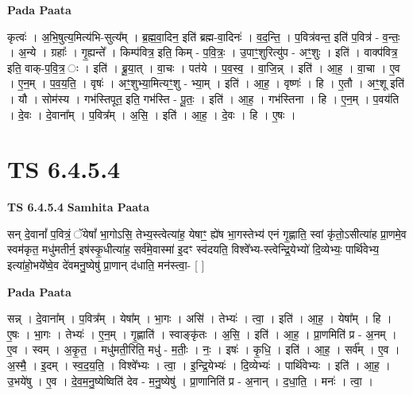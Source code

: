 \documentclass[17pt]{extarticle}
\begin{document}
\textbf{Pada Paata} \newline

कृत्वः॑ । अ॒भि॒षुत्य॒मित्य॑भि-सुत्य᳚म् । ब्र॒ह्म॒वा॒दिन॒ इति॑ ब्रह्म-वा॒दिनः॑ । व॒द॒न्ति॒ । प॒वित्र॑वन्त॒ इति॑ प॒वित्र॑ - व॒न्तः॒ । अ॒न्ये । ग्रहाः᳚ । गृ॒ह्यन्ते᳚ । किम्प॑वित्र॒ इति॒ किम् - प॒वि॒त्रः॒ । उ॒पाꣳ॒॒शुरित्यु॑प - अꣳ॒॒शुः । इति॑ । वाक्प॑वित्र॒ इति॒ वाक्-प॒वि॒त्र॒ ः । इति॑ । ब्रू॒या॒त् । वा॒चः । पत॑ये । प॒व॒स्व॒ । वा॒जि॒न्न् । इति॑ । आ॒ह॒ । वा॒चा । ए॒व । ए॒न॒म् । प॒व॒य॒ति॒ । वृषः॑ । अꣳ॒॒शुभ्या॒मित्यꣳ॒॒शु - भ्या॒म् । इति॑ । आ॒ह॒ । वृष्णः॑ । हि । ए॒तौ । अꣳ॒॒शू इति॑ । यौ । सोम॑स्य । गभ॑स्तिपूत॒ इति॒ गभ॑स्ति - पू॒तः॒ । इति॑ । आ॒ह॒ । गभ॑स्तिना । हि । ए॒न॒म् । प॒वय॑ति । दे॒वः । दे॒वाना᳚म् । प॒वित्र᳚म् । अ॒सि॒ । इति॑ । आ॒ह॒ । दे॒वः । हि । ए॒षः ।  \newline





\section{ TS 6.4.5.4 }

\textbf{TS 6.4.5.4 } \newline
\textbf{Samhita Paata} \newline

सन् दे॒वानां᳚ प॒वित्रं॒ ॅयेषां᳚ भा॒गोऽसि॒ तेभ्य॒स्त्वेत्या॑ह॒ येषाꣳ॒॒ ह्ये॑ष भा॒गस्तेभ्य॑ एनं गृ॒ह्णाति॒ स्वां कृ॑तो॒ऽसीत्या॑ह प्रा॒णमे॒व स्वम॑कृत॒ मधु॑मतीर्न॒ इष॑स्कृ॒धीत्या॑ह॒ सर्व॑मे॒वास्मा॑ इ॒दꣳ स्व॑दयति॒ विश्वे᳚भ्य-स्त्वेन्द्रि॒येभ्यो॑ दि॒व्येभ्यः॒ पार्थि॑वेभ्य॒ इत्या॑हो॒भये᳚ष्वे॒व दे॑वमनु॒ष्येषु॑ प्रा॒णान् द॑धाति॒ मन॑स्त्वा॒- [  ] \newline

\textbf{Pada Paata} \newline

सन्न् । दे॒वाना᳚म् । प॒वित्र᳚म् । येषा᳚म् । भा॒गः । असि॑ । तेभ्यः॑ । त्वा॒ । इति॑ । आ॒ह॒ । येषा᳚म् । हि । ए॒षः । भा॒गः । तेभ्यः॑ । ए॒न॒म् । गृ॒ह्णाति॑ । स्वाङ्कृ॑तः । अ॒सि॒ । इति॑ । आ॒ह॒ । प्रा॒णमिति॑ प्र - अ॒नम् । ए॒व । स्वम् । अ॒कृ॒त॒ । मधु॑मती॒रिति॒ मधु॑ - म॒तीः॒ । नः॒ । इषः॑ । कृ॒धि॒ । इति॑ । आ॒ह॒ । सर्व᳚म् । ए॒व । अ॒स्मै॒ । इ॒दम् । स्व॒द॒य॒ति॒ । विश्वे᳚भ्यः । त्वा॒ । इ॒न्द्रि॒येभ्यः॑ । दि॒व्येभ्यः॑ । पार्थि॑वेभ्यः । इति॑ । आ॒ह॒ । उ॒भये॑षु । ए॒व । दे॒व॒म॒नु॒ष्येष्विति॑ देव - म॒नु॒ष्येषु॑ । प्रा॒णानिति॑ प्र - अ॒नान् । द॒धा॒ति॒ । मनः॑ । त्वा॒ ।  \newline
\end{document}
